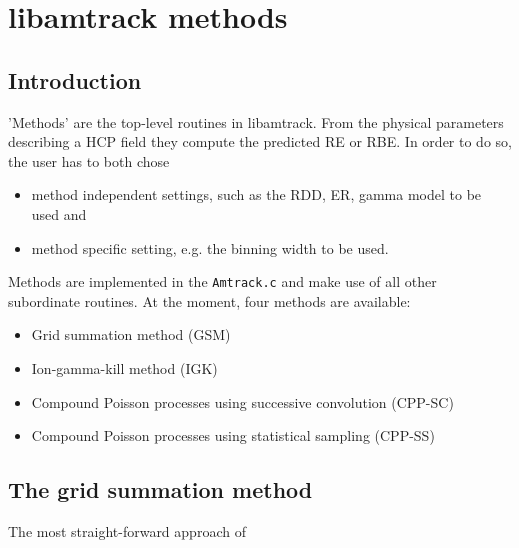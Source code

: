 
\chapter{libamtrack methods}

\section{Introduction}
'Methods' are the top-level routines in libamtrack. From the physical parameters describing a HCP field they compute the predicted RE or RBE. In order to do so, the user has to both chose 
\begin{itemize}
\item{method independent settings, such as the RDD, ER, gamma model to be used and}
\item{method specific setting, e.g. the binning width to be used.}
\end{itemize}

Methods are implemented in the \texttt{Amtrack.c} and make use of all other subordinate routines. At the moment, four methods are available:
\begin{itemize}
\item{Grid summation method (GSM)}
\item{Ion-gamma-kill method (IGK)}
\item{Compound Poisson processes using successive convolution (CPP-SC)}
\item{Compound Poisson processes using statistical sampling (CPP-SS)}
\end{itemize}

\section{The grid summation method}
The most straight-forward approach of